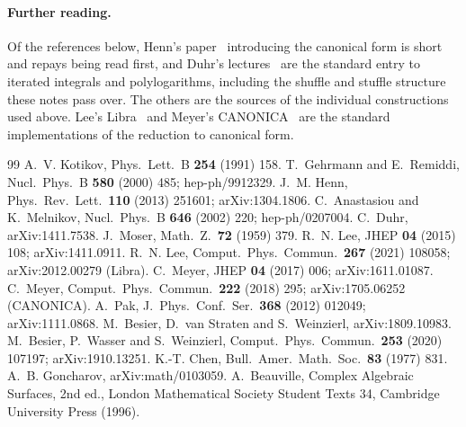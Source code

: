 \documentclass[11pt]{article}
\begin{document}
\paragraph{Further reading.}  Of the references below, Henn's
paper~\cite{henn} introducing the canonical form is short and repays
being read first, and Duhr's lectures~\cite{duhr} are the standard
entry to iterated integrals and polylogarithms, including the shuffle
and stuffle structure these notes pass over.  The others are the
sources of the individual constructions used above.  Lee's
Libra~\cite{lee} and Meyer's CANONICA~\cite{meyer} are the standard
implementations of the reduction to canonical form.

\sloppy\small
\begin{thebibliography}{99}
 A.~V. Kotikov, Phys.\ Lett.\ B \textbf{254} (1991)
  158.
 T.~Gehrmann and E.~Remiddi, Nucl.\ Phys.\ B \textbf{580}
  (2000) 485; hep-ph/9912329.
 J.~M. Henn, Phys.\ Rev.\ Lett.\ \textbf{110} (2013)
  251601; arXiv:1304.1806.
 C.~Anastasiou and K.~Melnikov, Nucl.\ Phys.\ B
  \textbf{646} (2002) 220; hep-ph/0207004.
 C.~Duhr, arXiv:1411.7538.
 J.~Moser, Math.\ Z.\ \textbf{72} (1959) 379.
 R.~N. Lee, JHEP \textbf{04} (2015) 108;
  arXiv:1411.0911.
  R.~N. Lee, Comput.\ Phys.\ Commun.\ \textbf{267} (2021) 108058;
  arXiv:2012.00279 (Libra).
 C.~Meyer, JHEP \textbf{04} (2017) 006;
  arXiv:1611.01087.
  C.~Meyer, Comput.\ Phys.\ Commun.\ \textbf{222} (2018) 295;
  arXiv:1705.06252 (CANONICA).
 A.~Pak, J.\ Phys.\ Conf.\ Ser.\ \textbf{368} (2012)
  012049; arXiv:1111.0868.
 M.~Besier, D.~van Straten and S.~Weinzierl,
  arXiv:1809.10983.
  M.~Besier, P.~Wasser and S.~Weinzierl, Comput.\ Phys.\ Commun.\
  \textbf{253} (2020) 107197; arXiv:1910.13251.
 K.-T. Chen, Bull.\ Amer.\ Math.\ Soc.\ \textbf{83}
  (1977) 831.
 A.~B. Goncharov, arXiv:math/0103059.
 A.~Beauville, Complex Algebraic Surfaces, 2nd
  ed., London Mathematical Society Student Texts 34, Cambridge
  University Press (1996).
\end{thebibliography}
\end{document}
